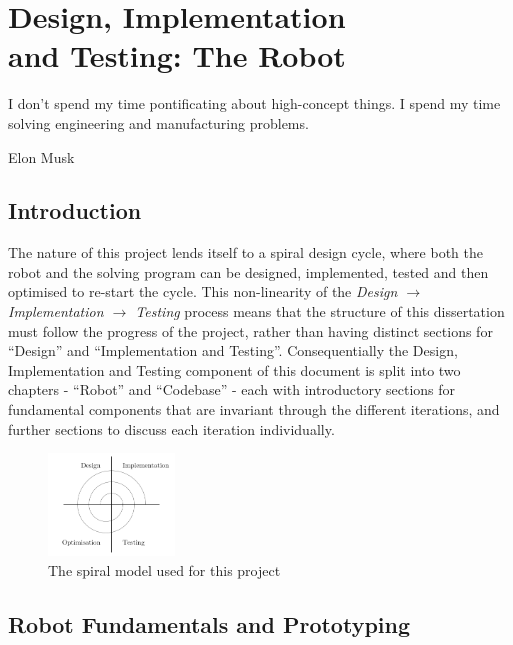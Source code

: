 \documentclass{report}
\newcommand{\tit}[1]{\textit{#1}}
\begin{document}
    \newpage
    
    \chapter[Design, Implementation and Testing: The Robot]{Design, Implementation \\ and Testing: The Robot} \label{chp:designRobot}
    \epigraph{I don't spend my time pontificating about high-concept things. I spend my time solving engineering and manufacturing problems.}{Elon Musk\cite{Ohnsman2013}}
    
	\section{Introduction}
	
	The nature of this project lends itself to a spiral design cycle, where both the robot and the solving program can be designed, implemented, tested and then optimised to re-start the cycle. This non-linearity of the \tit{Design $\rightarrow$ Implementation $\rightarrow$ Testing} process means that the structure of this dissertation must follow the progress of the project, rather than having distinct sections for \enquote{Design} and \enquote{Implementation and Testing}. Consequentially the Design, Implementation and Testing component of this document is split into two chapters - \enquote{Robot} and \enquote{Codebase} - each with introductory sections for fundamental components that are invariant through the different iterations, and further sections to discuss each iteration individually.

	\begin{figure}[H]
		\begin{center}
			\includegraphics[width=0.3\textwidth]{Resources/Images/diagSpiralModel.png}
			\caption{The spiral model used for this project}
			\label{fig:diagSpiralModel}
		\end{center}
	\end{figure}

    \section{Robot Fundamentals and Prototyping}
    
\end{document}
